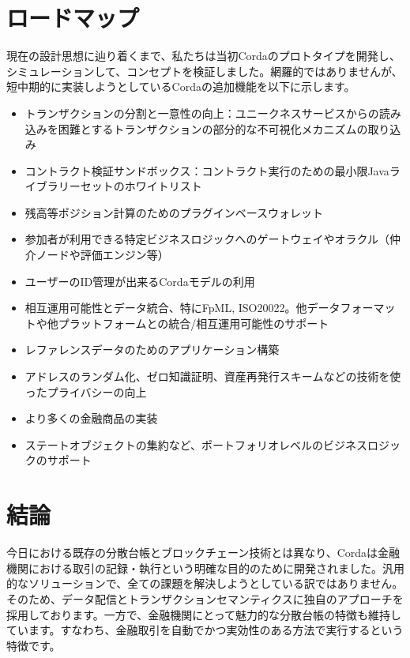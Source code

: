 \documentclass{article}
\begin{document}



\section{ロードマップ}
現在の設計思想に辿り着くまで、私たちは当初Cordaのプロトタイプを開発し、シミュレーションして、コンセプトを検証しました。網羅的ではありませんが、短中期的に実装しようとしているCordaの追加機能を以下に示します。
\begin{itemize}	
\item トランザクションの分割と一意性の向上：ユニークネスサービスからの読み込みを困難とするトランザクションの部分的な不可視化メカニズムの取り込み
\item コントラクト検証サンドボックス：コントラクト実行のための最小限Javaライブラリーセットのホワイトリスト
\item 残高等ポジション計算のためのプラグインベースウォレット
\item 参加者が利用できる特定ビジネスロジックへのゲートウェイやオラクル（仲介ノードや評価エンジン等）
\item ユーザーのID管理が出来るCordaモデルの利用
\item 相互運用可能性とデータ統合、特にFpML, ISO20022。他データフォーマットや他プラットフォームとの統合/相互運用可能性のサポート
\item レファレンスデータのためのアプリケーション構築
\item アドレスのランダム化、ゼロ知識証明、資産再発行スキームなどの技術を使ったプライバシーの向上
\item より多くの金融商品の実装
\item ステートオブジェクトの集約など、ポートフォリオレベルのビジネスロジックのサポート
\end{itemize}
\section{結論}
今日における既存の分散台帳とブロックチェーン技術とは異なり、Cordaは金融機関における取引の記録・執行という明確な目的のために開発されました。汎用的なソリューションで、全ての課題を解決しようとしている訳ではありません。そのため、データ配信とトランザクションセマンティクスに独自のアプローチを採用しております。一方で、金融機関にとって魅力的な分散台帳の特徴も維持しています。すなわち、金融取引を自動でかつ実効性のある方法で実行するという特徴です。


\end{document}
